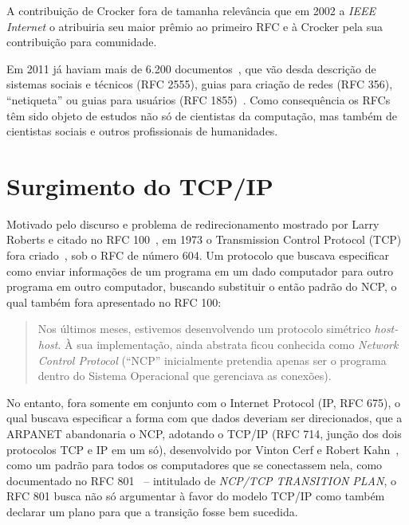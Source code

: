 \documentclass[conference]{IEEEtran}
\begin{document}
  A contribuição de Crocker fora de tamanha relevância que em 2002 a \emph{IEEE Internet} o atribuiria seu maior prêmio ao primeiro RFC e à Crocker pela sua contribuição para comunidade.

  Em 2011 já haviam mais de 6.200 documentos~\cite{framingyears}, que vão desda
  descrição de sistemas sociais e técnicos (RFC 2555), guias para criação de
  redes (RFC 356), ``netiqueta'' ou guias para usuários
  (RFC 1855)~\cite{framingyears}. Como
  consequência os RFCs têm sido objeto de estudos não só de cientistas da
  computação, mas também de cientistas sociais e outros profissionais de
  humanidades.

  \section{Surgimento do TCP/IP}
	

  Motivado pelo discurso e problema de redirecionamento mostrado por Larry
  Roberts e citado no RFC 100~\cite{rfc100}, em 1973 o Transmission Control
  Protocol (TCP) fora criado~\cite{framingyears}, sob o RFC de número 604. Um
  protocolo que buscava especificar como enviar informações de um programa em um
  dado computador para outro programa em outro computador, buscando substituir o
  então padrão do NCP, o qual também fora apresentado no RFC 100:

  \begin{quote}

    Nos últimos meses, estivemos desenvolvendo um protocolo simétrico
    \emph{host-host}. À sua implementação, ainda abstrata ficou conhecida como 
    \emph{Network Control Protocol} (``NCP'' inicialmente pretendia apenas ser o
    programa dentro do Sistema Operacional que gerenciava as conexões).
    ~\cite{rfc100}
    
  \end{quote}
  
  No entanto, fora somente em conjunto com o Internet Protocol (IP, RFC 675), o
  qual buscava especificar a forma com que dados deveriam ser direcionados, que a
  ARPANET abandonaria o NCP, adotando o TCP/IP (RFC 714, junção dos dois
  protocolos TCP e IP em um só), desenvolvido por
  Vinton Cerf e Robert Kahn~\cite{fromarpanet}, como um padrão para todos os
  computadores que se conectassem nela, como documentado no RFC 801~\cite{rfc801} -- intitulado de \emph{NCP/TCP TRANSITION PLAN}, o RFC 801 busca não só argumentar à favor do modelo TCP/IP como também declarar um plano para que a transição fosse bem sucedida.
  
\end{document}
